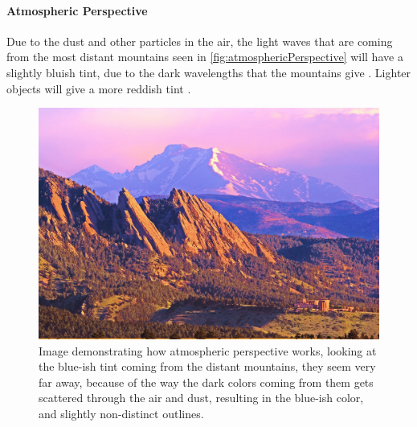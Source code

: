 			\paragraph{Atmospheric Perspective}
				Due to the dust and other particles in the air, the light waves that are coming from the most distant mountains seen in \autoref{fig:atmosphericPerspective} will have a slightly bluish tint, due to the dark wavelengths that the mountains give \citep{atmoshpericPerspective}. Lighter objects will give a more reddish tint \citep{atmoshpericPerspective}. 
				\begin{figure}[H]
					\centering
					\includegraphics[width=0.8\linewidth]{figure/atmosphericperspective}
					\caption{Image demonstrating how atmospheric perspective works, looking at the blue-ish tint coming from the distant mountains, they seem very far away, because of the way the dark colors coming from them gets scattered through the air and dust, resulting in the blue-ish color, and slightly non-distinct outlines.}
					\label{fig:atmosphericPerspective}
				\end{figure}
